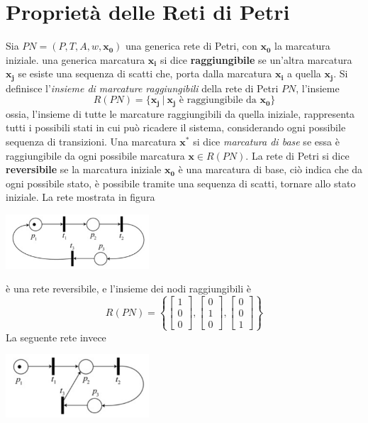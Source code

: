 \documentclass[10pt, letterpaper]{report}
\begin{document}
\section{Proprietà delle Reti di Petri}
Sia $PN=(P,T,A,w,\mathbf {x_0})$ una generica rete di Petri, con $\mathbf{x_0}$ la marcatura iniziale.\acc 
{} una generica marcatura $\mathbf{x_i}$ si dice \textbf{raggiungibile} se un'altra marcatura $\mathbf{x_j}$ se esiste una sequenza di scatti che, porta dalla marcatura $\mathbf{x_i}$ a quella $\mathbf{x_j}$.\acc 
Si definisce l'\textit{insieme di marcature raggiungibili} della rete di Petri $PN$, l'insieme 
$$ R(PN)=\{\mathbf{x_j} \ | \ \mathbf{x_j} \text{ è raggiungibile da }\mathbf{x_0}\}$$
ossia, l'insieme di tutte le marcature raggiungibili da quella iniziale, rappresenta tutti i possibili stati in cui può ricadere il sistema, considerando ogni possibile sequenza di transizioni.\acc 
Una marcatura $\mathbf{x^*}$ si dice \textit{marcatura di base} se essa è raggiungibile da ogni possibile marcatura $\mathbf{x}\in R(PN)$.\acc 
{} La rete di Petri si dice \textbf{reversibile} se la marcatura iniziale $\mathbf{x_0}$ è una marcatura di base, ciò indica che da ogni possibile stato, è possibile tramite una sequenza di scatti, tornare allo stato iniziale.
\acc La rete mostrata in figura \begin{center}
    \includegraphics[width=0.4\textwidth]{images/reversibile.png}
\end{center}
è una rete reversibile, e l'insieme dei nodi raggiungibili è 
$$R(PN) = \left\{ \begin{bmatrix} 1 \\ 0 \\ 0 \end{bmatrix}, \begin{bmatrix} 0 \\ 1 \\ 0 \end{bmatrix}, \begin{bmatrix} 0 \\ 0 \\ 1 \end{bmatrix} \right\}$$
La seguente rete invece\begin{center}
    \includegraphics[width=0.4\textwidth]{images/irreversibile.png}
\end{center}
\end{document}
